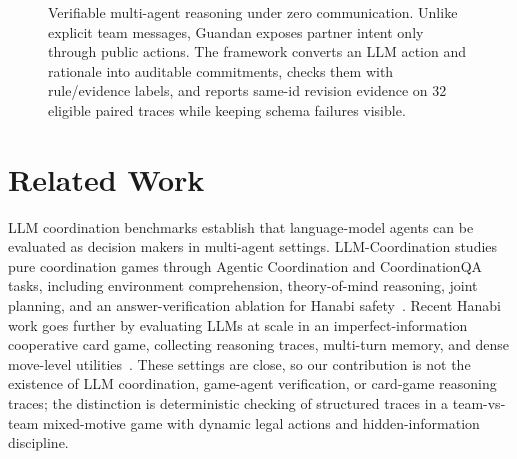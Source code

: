 \documentclass[sigconf,anonymous,review]{acmart}
\begin{document}
\begin{figure}[t]
{
}
\fi
\caption{Verifiable multi-agent reasoning under zero communication. Unlike explicit team messages, Guandan exposes partner intent only through public actions. The framework converts an LLM action and rationale into auditable commitments, checks them with rule/evidence labels, and reports same-id revision evidence on 32 eligible paired traces while keeping schema failures visible.}
\label{fig:pipeline}
\end{figure}

\section{Related Work}

LLM coordination benchmarks establish that language-model agents can be evaluated as decision makers in multi-agent settings. LLM-Coordination studies pure coordination games through Agentic Coordination and CoordinationQA tasks, including environment comprehension, theory-of-mind reasoning, joint planning, and an answer-verification ablation for Hanabi safety~\citep{agashe2023llmcoordination}. Recent Hanabi work goes further by evaluating LLMs at scale in an imperfect-information cooperative card game, collecting reasoning traces, multi-turn memory, and dense move-level utilities~\citep{ramesh2026hanabi}. These settings are close, so our contribution is not the existence of LLM coordination, game-agent verification, or card-game reasoning traces; the distinction is deterministic checking of structured traces in a team-vs-team mixed-motive game with dynamic legal actions and hidden-information discipline.
\end{document}
